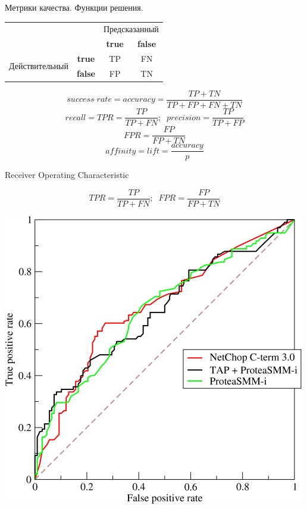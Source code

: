 \documentclass[10pt,a4paper]{beamer}
\begin{document}
\begin{frame}{Метрики качества. Функции решения.}

\begin{center}
\begin{tabular}{|c r | c c|}
\cline{3-4}
 \multicolumn{2}{c|}{} & \multicolumn{2}{c|}{Предсказанный} \\
 \cline{3-4}
 \multicolumn{2}{c|}{} & {\bf true} & {\bf false} \\
 \hline
 \multirow{2}{*}{Действительный} & \multicolumn{1}{|c|}{\bf true} & TP & FN \\
 & \multicolumn{1}{|c|}{\bf false}  & FP & TN \\
 \hline
\end{tabular}
\end{center}

\[
success\;rate = accuracy = \frac{TP + TN}{TP + FP + FN + TN}
\]
\[
recall = TPR = \frac{TP}{TP + FN};\;\;precision = \frac{TP}{TP + FP}
\]
\[
FPR = \frac{FP}{FP + TN}
\]
\[
affinity = lift = \frac{accuracy}{p}
\]

\end{frame}


\begin{frame}{Receiver Operating Characteristic}

\[
TPR = \frac{TP}{TP + FN};\;\;FPR = \frac{FP}{FP + TN}
\]

\begin{center}
\includegraphics[scale=2.0]{images/roc.png}
\end{center}

\end{frame}
\end{document}
